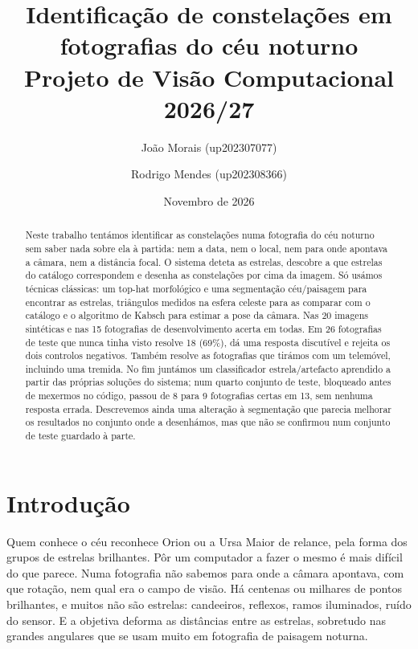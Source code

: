 \documentclass[11pt,a4paper]{article}
\title{\textbf{Identificação de constelações em fotografias do céu noturno}\\[4pt]
\large Projeto de Visão Computacional 2026/27}
\author{João Morais (up202307077) \and Rodrigo Mendes (up202308366)\\[4pt]}
\date{Novembro de 2026}
\begin{document}
\maketitle

\begin{abstract}
Neste trabalho tentámos identificar as constelações numa fotografia do céu
noturno sem saber nada sobre ela à partida: nem a data, nem o local, nem para
onde apontava a câmara, nem a distância focal. O sistema deteta as estrelas,
descobre a que estrelas do catálogo correspondem e desenha as constelações por
cima da imagem. Só usámos técnicas clássicas: um top-hat morfológico e uma
segmentação céu/paisagem para encontrar as estrelas, triângulos medidos na
esfera celeste para as comparar com o catálogo e o algoritmo de Kabsch para
estimar a pose da câmara. Nas 20 imagens sintéticas e nas 15 fotografias de
desenvolvimento acerta em todas. Em 26 fotografias de teste que nunca tinha
visto resolve 18 (69\%), dá uma resposta discutível e rejeita os dois
controlos negativos. Também resolve as fotografias que tirámos com um
telemóvel, incluindo uma tremida. No fim juntámos um classificador
estrela/artefacto aprendido a partir das próprias soluções do sistema; num
quarto conjunto de teste, bloqueado antes de mexermos no código, passou de 8
para 9 fotografias certas em 13, sem nenhuma resposta errada. Descrevemos
ainda uma alteração à segmentação que parecia melhorar os resultados no
conjunto onde a desenhámos, mas que não se confirmou num conjunto de teste
guardado à parte.
\end{abstract}

\section{Introdução}

Quem conhece o céu reconhece Orion ou a Ursa Maior de relance, pela forma dos
grupos de estrelas brilhantes. Pôr um computador a fazer o mesmo é mais
difícil do que parece. Numa fotografia não sabemos para onde a câmara
apontava, com que rotação, nem qual era o campo de visão. Há centenas ou
milhares de pontos brilhantes, e muitos não são estrelas: candeeiros,
reflexos, ramos iluminados, ruído do sensor. E a objetiva deforma as
distâncias entre as estrelas, sobretudo nas grandes angulares que se usam
muito em fotografia de paisagem noturna.
\end{document}
